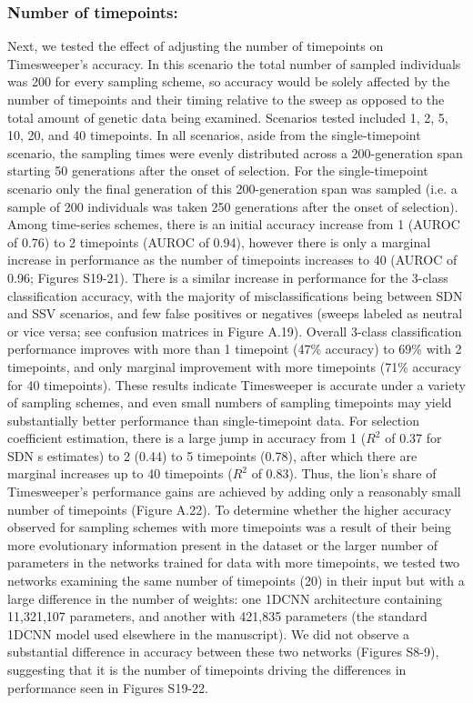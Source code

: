 \subsubsection{Number of timepoints:} Next, we tested the effect of adjusting the number of timepoints on Timesweeper’s accuracy. In this scenario the total number of sampled individuals was 200 for every sampling scheme, so accuracy would be solely affected by the number of timepoints and their timing relative to the sweep as opposed to the total amount of genetic data being examined. Scenarios tested included 1, 2, 5, 10, 20, and 40 timepoints. In all scenarios, aside from the single-timepoint scenario, the sampling times were evenly distributed across a 200-generation span starting 50 generations after the onset of selection. For the single-timepoint scenario only the final generation of this 200-generation span was sampled (i.e. a sample of 200 individuals was taken 250 generations after the onset of selection). Among time-series schemes, there is an initial accuracy increase from 1 (AUROC of 0.76) to 2 timepoints (AUROC of 0.94), however there is only a marginal increase in performance as the number of timepoints increases to 40 (AUROC of 0.96; Figures S19-21). There is a similar increase in performance for the 3-class classification accuracy, with the majority of misclassifications being between SDN and SSV scenarios, and few false positives or negatives (sweeps labeled as neutral or vice versa; see confusion matrices in Figure A.19). Overall 3-class classification performance improves with more than 1 timepoint (47\% accuracy) to 69\% with 2 timepoints, and only marginal improvement with more timepoints (71\% accuracy for 40 timepoints). These results indicate Timesweeper is accurate under a variety of sampling schemes, and even small numbers of sampling timepoints may yield substantially better performance than single-timepoint data. For selection coefficient estimation, there is a large jump in accuracy from 1 ($R^2$ of 0.37 for SDN s estimates) to 2 (0.44) to 5 timepoints (0.78), after which there are marginal increases up to 40 timepoints ($R^2$ of 0.83). Thus, the lion’s share of Timesweeper’s performance gains are achieved by adding only a reasonably small number of timepoints (Figure A.22).
To determine whether the higher accuracy observed for sampling schemes with more timepoints was a result of their being more evolutionary information present in the dataset or the larger number of parameters in the networks trained for data with more timepoints, we tested two networks examining the same number of timepoints (20) in their input but with a large difference in the number of weights: one 1DCNN architecture containing 11,321,107 parameters, and another with 421,835 parameters (the standard 1DCNN model used elsewhere in the manuscript). We did not observe a substantial difference in accuracy between these two networks (Figures S8-9), suggesting that it is the number of timepoints driving the differences in performance seen in Figures S19-22. \\

